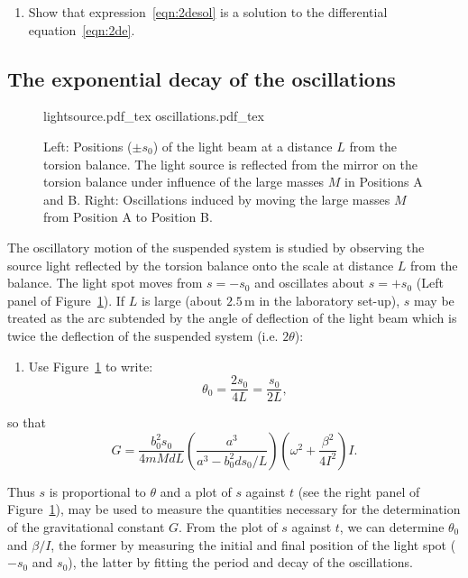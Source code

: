 \documentclass{article}
\begin{document}
\begin{enumerate}[resume]
\item Show that expression~\ref{eqn:2desol} is a solution to the
  differential equation~\ref{eqn:2de}.
\end{enumerate}

\subsection*{The exponential decay of the oscillations}
\begin{figure}
  \centering
  \def\svgwidth{0.4\columnwidth}
  {lightsource.pdf_tex}\hspace{2cm}
  \def\svgwidth{0.45\columnwidth}
  {oscillations.pdf_tex}
  \caption{Left: Positions ($\pm s_0$) of the light beam at a
    distance $L$ from the torsion balance. The light source is
    reflected from the mirror on the torsion balance under influence
    of the large masses $M$ in Positions A and B. Right: Oscillations
    induced by moving the large masses $M$ from Position A to Position
    B.}
  \label{fig:light}
\end{figure}
The oscillatory motion of the suspended system is studied by observing
the source light reflected by the torsion balance onto the scale at
distance $L$ from the balance. The light spot moves from
$s=-s_{0}$ and oscillates about $s=+s_{0}$ (Left panel of
Figure~\ref{fig:light}).  If $L$ is large (about $2.5\mathrm{\,m}$ in
the laboratory set-up), $s$ may be treated as the arc subtended by the
angle of deflection of the light beam which is twice the deflection of
the suspended system (i.e. $2\theta$):
\begin{enumerate}[resume]
\item Use Figure~\ref{fig:light} to write:%
  \begin{equation}
    \theta_{0}=\frac{2s_{0}}{4L}=\frac{s_{0}}{2L},
    \label{eqn:G4}%
  \end{equation}
\end{enumerate}
so that
\begin{equation}
  G=\frac{b_0^{2}s_0}{4mMdL}
  \left(\frac{a^{3}}{a^{3}-b_0^{2}ds_0/L}\right)
  \left(\omega^2+\frac{\beta^{2}}{4I^{2}}\right)I.
  \label{eqn:G5}%
\end{equation}

Thus $s$ is proportional to $\theta$ and a plot of $s$ against $t$
(see the right panel of Figure~\ref{fig:light}), may be used to
measure the quantities necessary for the determination of the
gravitational constant $G$. From the plot of $s$ against $t$, we can
determine $\theta_{0}$ and $\beta/I$, the former by measuring the
initial and final position of the light spot ($-s_{0}$ and $s_{0}$),
the latter by fitting the period and decay of the oscillations.
\end{document}
